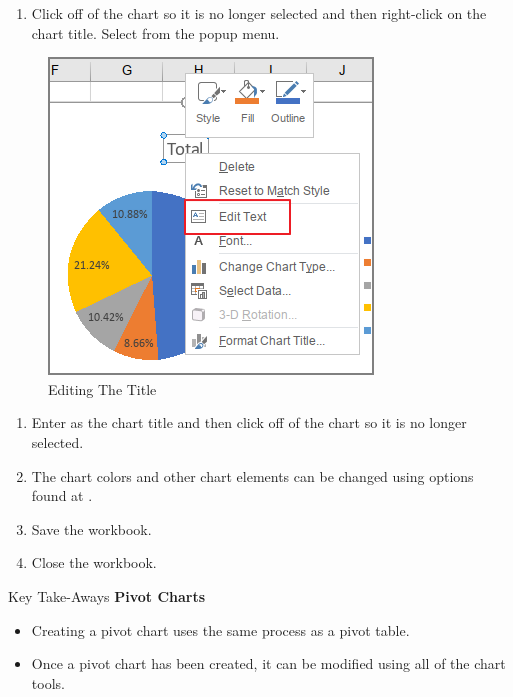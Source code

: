\begin{enumerate}[resume]	
	\item Click off of the chart so it is no longer selected and then right-click on the chart title. Select  from the popup menu.
\end{enumerate}

\begin{figure}[H]
	\centering
	\includegraphics[width=\maxwidth{.75\linewidth}]{gfx/ch07_fig32}
	\caption{Editing The Title}
	\label{07:fig32}
\end{figure}

\begin{enumerate}[resume]	
	\item Enter  as the chart title and then click off of the chart so it is no longer selected.
	\item The chart colors and other chart elements can be changed using options found at .
	\item Save the workbook.
	\item Close the workbook.
\end{enumerate}

\begin{center}
	\begin{tkwbox}{Key Take-Aways}
		\textbf{Pivot Charts}
		\\
		\begin{itemize}
			\setlength{\itemsep}{0pt}
			\setlength{\parskip}{0pt}
			\setlength{\parsep}{0pt}
			
			\item Creating a pivot chart uses the same process as a pivot table.
			\item Once a pivot chart has been created, it can be modified using all of the chart tools.
			
		\end{itemize}
	\end{tkwbox}
\end{center}

